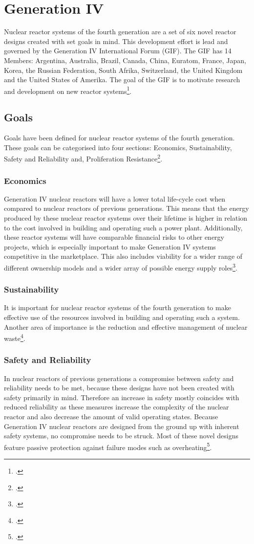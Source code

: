 \chapter{Generation IV}
Nuclear reactor systems of the fourth generation are a set of six novel reactor designs created with
set goals in mind. This development effort is lead and governed by the Generation IV International Forum
(GIF). The GIF has 14 Members: Argentina, Australia, Brazil, Canada, China, Euratom, France, Japan,
Korea, the Russian Federation, South Afrika, Switzerland, the United Kingdom and the United States of Amerika.
The goal of the GIF is to motivate research and development on new reactor systems\footcite[6]{GIFAR}.
\section{Goals}
Goals have been defined for nuclear reactor systems of the fourth generation. These goals
can be categorised into four sections: Economics, Sustainability, Safety and Reliability and, Proliferation Resistance\footcite[38]{IVHandbook}.
\subsection{Economics}
Generation IV nuclear reactors will have a lower total life-cycle cost when compared to nuclear reactors
of previous generations. This means that the energy produced by these nuclear reactor systems over
their lifetime is higher in relation to the cost involved in building and operating such a power plant.
Additionally, these reactor systems will have comparable financial risks to other energy projects, which
is especially important to make Generation IV systems competitive in the marketplace. This also includes
viability for a wider range of different ownership models and a wider array of possible energy supply roles\footcite[6]{GIFAR}.
\subsection{Sustainability}
It is important for nuclear reactor systems of the fourth generation to make effective use of the resources
involved in building and operating such a system. Another area of importance is the reduction and effective
management of nuclear waste\footcite[38]{IVHandbook}.
\subsection{Safety and Reliability}
In nuclear reactors of previous generations a compromise between safety and reliability needs to be met,
because these designs have not been created with safety primarily in mind. Therefore an increase in safety
mostly coincides with reduced reliability as these measures increase the complexity of the nuclear reactor and
also decrease the amount of valid operating states. Because Generation IV nuclear reactors are designed from the ground up
with inherent safety systems, no compromise needs to be struck. Most of these novel designs feature passive
protection against failure modes such as overheating\footcite[6]{GIFAR}.
